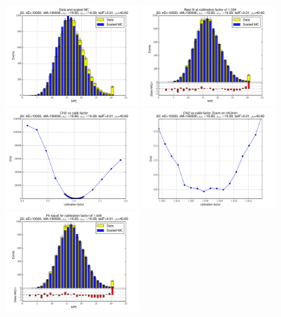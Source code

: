 
 \begin{figure}[htbp] \begin{center} 
\includegraphics[width=0.45\textwidth]{../FIGURES/23/FIG_Data_and_scaled_MC.pdf} 
\includegraphics[width=0.45\textwidth]{../FIGURES/23/FIG_Best_fit_at_calibration_factor_of_1_038.pdf} 
\includegraphics[width=0.45\textwidth]{../FIGURES/23/FIG_Chi2_vs_calib_factor.pdf} 
\includegraphics[width=0.45\textwidth]{../FIGURES/23/FIG_Chi2_vs_calib_factor_Zoom_on_chi2min.pdf} 
\includegraphics[width=0.45\textwidth]{../FIGURES/23/FIG_Fit_result_for_calibration_factor_of_1_045.pdf} 

\end{center}
\end{figure}
